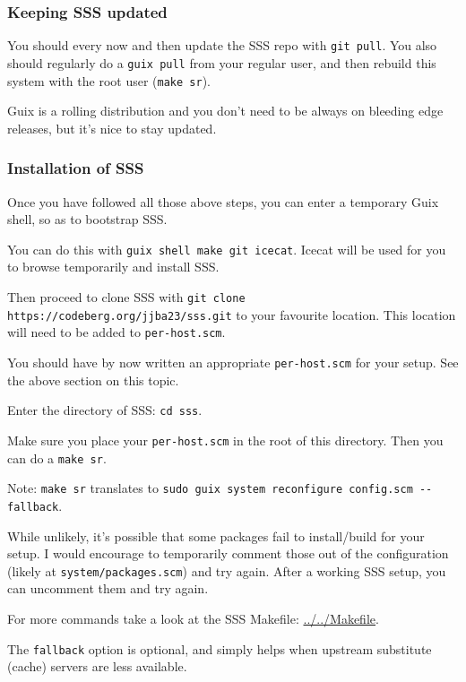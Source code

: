 \documentclass[11pt]{article}
\begin{document}
\subsubsection{Keeping SSS updated}
\label{sec:org688d4c7}

You should every now and then update the SSS repo with \texttt{git pull}. You also should regularly do a \texttt{guix pull} from your regular user, and then rebuild this system with the root user (\texttt{make sr}).

Guix is a rolling distribution and you don't need to be always on bleeding edge releases, but it's nice to stay updated.

\subsubsection{Installation of SSS}
\label{sec:orga8e2672}

Once you have followed all those above steps, you can enter a temporary Guix shell, so as to bootstrap SSS.

You can do this with \texttt{guix shell make git icecat}. Icecat will be used for you to browse temporarily and install SSS.

Then proceed to clone SSS with \texttt{git clone https://codeberg.org/jjba23/sss.git} to your favourite location. This location will need to be added to \texttt{per-host.scm}.

You should have by now written an appropriate \texttt{per-host.scm} for your setup. See the above section on this topic.

Enter the directory of SSS: \texttt{cd sss}.

Make sure you place your \texttt{per-host.scm} in the root of this directory. Then you can do a \texttt{make sr}.

Note: \texttt{make sr} translates to \texttt{sudo guix system reconfigure config.scm -{}-{}fallback}.

While unlikely, it's possible that some packages fail to install/build for your setup. I would encourage to temporarily comment those out of the configuration (likely at \texttt{system/packages.scm}) and try again. After a working SSS setup, you can uncomment them and try again.

For more commands take a look at the SSS Makefile: \url{../../Makefile}.

The \texttt{fallback} option is optional, and simply helps when upstream substitute (cache) servers are less available.
\end{document}
